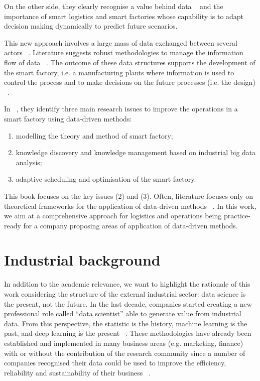 On the other side, they clearly recognise a value behind data ~\cite{Balandin2015, Uckelmann2008} and the importance of smart logistics and smart factories whose capability is to adapt decision making dynamically to predict future scenarios.\par

This new approach involves a large mass of data exchanged between several actors ~\cite{Kawa2012, Singh2017}. Literature suggests robust methodologies to manage the information flow of data ~\cite{Tran-Dang2018}. The outcome of these data structures supports the development of the smart factory, i.e. a manufacturing plants where information is used to control the process and to make decisions on the future processes (i.e. the design) ~\cite{Hajdul2011}. \par

In ~\cite{TAN2018}, they identify three main research issues to improve the operations in a smart factory using data-driven methods:

\begin{enumerate}
    \item modelling the theory and method of smart factory;
    \item knowledge discovery and knowledge management based on industrial big data analysis;
    \item adaptive scheduling and optimisation of the smart factory.

\end{enumerate}

This book focuses on the key issues (2) and (3). Often, literature focuses only on theoretical frameworks for the application of data-driven methods ~\cite{DaSilva2019}. In this work, we aim at a comprehensive approach for logistics and operations being practice-ready for a company proposing areas of application of data-driven methods.

\section{Industrial background}
In addition to the academic relevance, we want to highlight the rationale of this work considering the structure of the external industrial sector: data science is the present, not the future. In the last decade, companies started creating a new professional role called “data scientist” able to generate value from industrial data. From this perspective, the statistic is the history, machine learning is the past, and deep learning is the present ~\cite{HubSpot2016}. These methodologies have already been established and implemented in many business areas (e.g. marketing, finance) with or without the contribution of the research community since a number of companies recognised their data could be used to improve the efficiency, reliability and sustainability of their business ~\cite{Nascimento2019, Trkman2010}.\par

